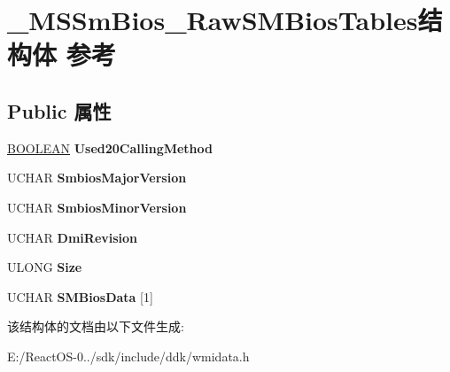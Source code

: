 \hypertarget{struct___m_s_sm_bios___raw_s_m_bios_tables}{}\section{\+\_\+\+M\+S\+Sm\+Bios\+\_\+\+Raw\+S\+M\+Bios\+Tables结构体 参考}
\label{struct___m_s_sm_bios___raw_s_m_bios_tables}
\subsection*{Public 属性}
\begin{DoxyCompactItemize}
\item 
\mbox{\label{struct___m_s_sm_bios___raw_s_m_bios_tables_ae84a640bdcebba3ffc9d50c49037b431}} 
\hyperlink{_processor_bind_8h_a112e3146cb38b6ee95e64d85842e380a}{B\+O\+O\+L\+E\+AN} {\bfseries Used20\+Calling\+Method}
\item 
\mbox{\label{struct___m_s_sm_bios___raw_s_m_bios_tables_ae1d9029ad8b0d957e53e8890a274ebf5}} 
U\+C\+H\+AR {\bfseries Smbios\+Major\+Version}
\item 
\mbox{\label{struct___m_s_sm_bios___raw_s_m_bios_tables_a2ca3d7c2225e40c077f4d2e23dcbfe03}} 
U\+C\+H\+AR {\bfseries Smbios\+Minor\+Version}
\item 
\mbox{\label{struct___m_s_sm_bios___raw_s_m_bios_tables_ab9b59d932ad49abd0417548f17aa1aab}} 
U\+C\+H\+AR {\bfseries Dmi\+Revision}
\item 
\mbox{\label{struct___m_s_sm_bios___raw_s_m_bios_tables_ad66b565e8c30e062d6a7c9003fff4145}} 
U\+L\+O\+NG {\bfseries Size}
\item 
\mbox{\label{struct___m_s_sm_bios___raw_s_m_bios_tables_a40cb073cb983c9d241f815f4ff05146f}} 
U\+C\+H\+AR {\bfseries S\+M\+Bios\+Data} \mbox{[}1\mbox{]}
\end{DoxyCompactItemize}


该结构体的文档由以下文件生成\+:\begin{DoxyCompactItemize}
\item 
E\+:/\+React\+O\+S-\/0../sdk/include/ddk/wmidata.\+h\end{DoxyCompactItemize}
